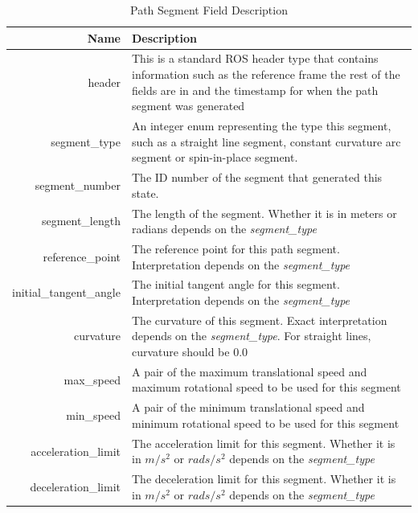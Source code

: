 \begin{table}[htbp]
	\begin{tabularx}{\textwidth}{|r|X|}
		\hline
		Name & Description \\
		\hline
		header & This is a standard ROS header type that contains information such as the reference frame the rest of the fields are in and the timestamp for when the path segment was generated \\
		\hline
		segment\_type & An integer enum representing the type this segment, such as a straight line segment, constant curvature arc segment or spin-in-place segment. \\
		\hline
		segment\_number & The ID number of the segment that generated this state. \\
		\hline
		segment\_length & The length of the segment. Whether it is in meters or radians depends on the \emph{segment\_type} \\
		\hline
		reference\_point & The reference point for this path segment. Interpretation depends on the \emph{segment\_type} \\
		\hline
		initial\_tangent\_angle & The initial tangent angle for this segment. Interpretation depends on the \emph{segment\_type} \\
		\hline
		curvature & The curvature of this segment. Exact interpretation depends on the \emph{segment\_type}. For straight lines, curvature should be 0.0 \\
		\hline
		max\_speed & A pair of the maximum translational speed and maximum rotational speed to be used for this segment \\
		\hline
		min\_speed & A pair of the minimum translational speed and minimum rotational speed to be used for this segment \\	
		\hline
		acceleration\_limit & The acceleration limit for this segment. Whether it is in $m/s^2$ or $rads/s^2$ depends on the \emph{segment\_type} \\
		\hline
		deceleration\_limit	& The deceleration limit for this segment. Whether it is in $m/s^2$ or $rads/s^2$ depends on the \emph{segment\_type} \\
		\hline
	\end{tabularx}
	\caption{Path Segment Field Description \label{table:path_segment_description}}
\end{table}

